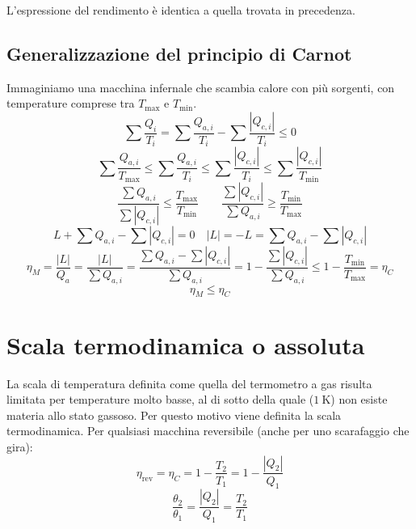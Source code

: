 L'espressione del rendimento è identica a quella trovata in precedenza.
\subsection{Generalizzazione del principio di Carnot}
Immaginiamo una macchina infernale che scambia calore con più sorgenti, con temperature comprese tra $T_{\max}$ e $T_{\min}$.
\[\sum\frac{Q_i}{T_i}=\sum\frac{Q_{a,i}}{T_i}-\sum\frac{|Q_{c,i}|}{T_i}\leq 0\]
\[\sum\frac{Q_{a,i}}{T_{\max}} \leq \sum\frac{Q_{a,i}}{T_i}\leq\sum\frac{|Q_{c,i}|}{T_i}\leq\sum\frac{|Q_{c,i}|}{T_{\min}}\]
\[\frac{\sum Q_{a,i}}{\sum|Q_{c,i}|}\leq\frac{T_{\max}}{T_{\min}}\qquad \frac{\sum |Q_{c,i}|}{\sum Q_{a,i}}\geq\frac{T_{\min}}{T_{\max}}\]
\[L+\sum Q_{a,i}-\sum|Q_{c,i}|=0\quad |L|=-L=\sum Q_{a,i}-\sum|Q_{c,i}|\]
\[\eta_M=\frac{|L|}{Q_a}=\frac{|L|}{\sum Q_{a,i}}=\frac{\sum Q_{a,i}-\sum |Q_{c,i}|}{\sum Q_{a,i}}=1-\frac{\sum|Q_{c,i}|}{\sum Q_{a,i}}\leq 1-\frac{T_{\min}}{T_{\max}}=\eta_C\]
\[\eta_M\leq\eta_C\]


\section{Scala termodinamica o assoluta}
La scala di temperatura definita come quella del termometro a gas risulta limitata per temperature molto basse, al di sotto della quale ($\SI{1}{\kelvin}$) non esiste materia allo stato gassoso. Per questo motivo viene definita la scala termodinamica. Per qualsiasi macchina reversibile (anche per uno scarafaggio che gira):
\[\eta_\text{rev}=\eta_C=1-\frac{T_2}{T_1}=1-\frac{|Q_2|}{Q_1}\]
\[\frac{\theta_2}{\theta_1}=\frac{|Q_2|}{Q_1}=\frac{T_2}{T_1}\]



